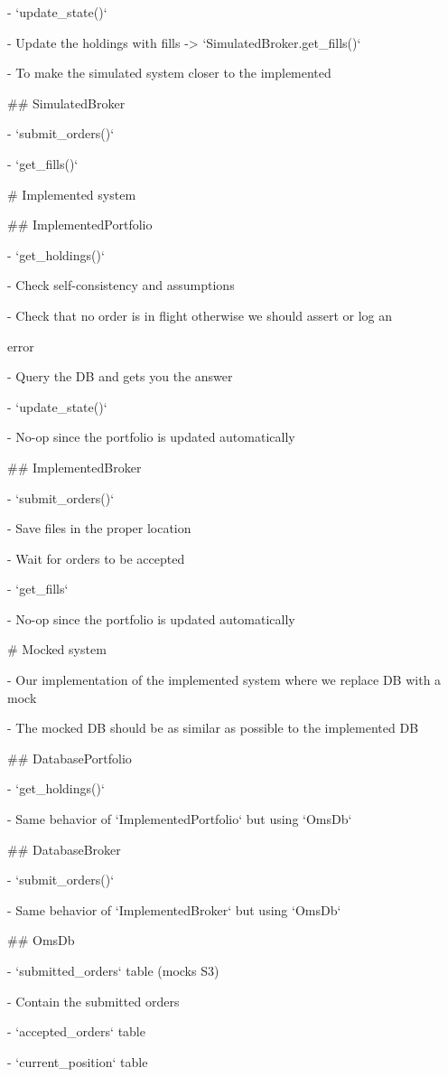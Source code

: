 \documentclass[11pt, reqno]{amsart}
\begin{document}
- `update\_state()`

- Update the holdings with fills -\textgreater{}
`SimulatedBroker.get\_fills()`

- To make the simulated system closer to the implemented

\#\# SimulatedBroker

- `submit\_orders()`

- `get\_fills()`

\# Implemented system

\#\# ImplementedPortfolio

- `get\_holdings()`

- Check self-consistency and assumptions

- Check that no order is in flight otherwise we should assert or log an

error

- Query the DB and gets you the answer

- `update\_state()`

- No-op since the portfolio is updated automatically

\#\# ImplementedBroker

- `submit\_orders()`

- Save files in the proper location

- Wait for orders to be accepted

- `get\_fills`

- No-op since the portfolio is updated automatically

\# Mocked system

- Our implementation of the implemented system where we replace DB with
a mock

- The mocked DB should be as similar as possible to the implemented DB

\#\# DatabasePortfolio

- `get\_holdings()`

- Same behavior of `ImplementedPortfolio` but using `OmsDb`

\#\# DatabaseBroker

- `submit\_orders()`

- Same behavior of `ImplementedBroker` but using `OmsDb`

\#\# OmsDb

- `submitted\_orders` table (mocks S3)

- Contain the submitted orders

- `accepted\_orders` table

- `current\_position` table
\end{document}
